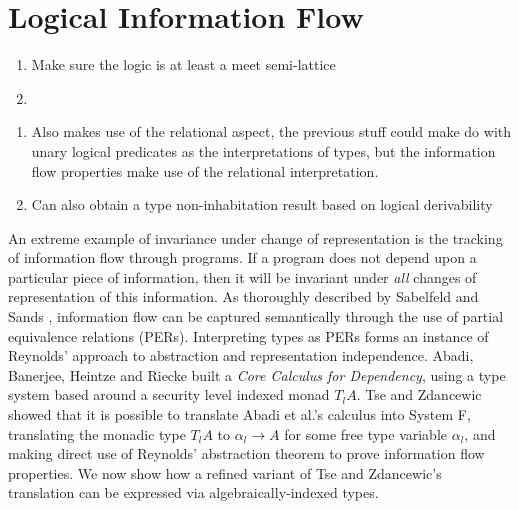 \section{Logical Information Flow}
\label{sec:information-flow}

\begin{enumerate}
\item Make sure the logic is at least a meet semi-lattice
\item 
\end{enumerate}

\begin{enumerate}
\item Also makes use of the relational aspect, the previous stuff
  could make do with unary logical predicates as the interpretations
  of types, but the information flow properties make use of the
  relational interpretation.
\item Can also obtain a type non-inhabitation result based on logical
  derivability
\end{enumerate}


An extreme example of invariance under change of representation is the
tracking of information flow through programs. If a program does not
depend upon a particular piece of information, then it will be
invariant under \emph{all} changes of representation of this
information. As thoroughly described by Sabelfeld and Sands
\cite{sabelfeld01per}, information flow can be captured semantically
through the use of partial equivalence relations (PERs). Interpreting
types as PERs forms an instance of Reynolds' approach to abstraction
and representation independence. Abadi, Banerjee, Heintze and Riecke
\cite{abadi99core} built a \emph{Core Calculus for Dependency}, using
a type system based around a security level indexed monad $T_lA$. Tse
and Zdancewic \cite{tse04translating} showed that it is possible to
translate Abadi et al.'s calculus into System F, translating the
monadic type $T_lA$ to $\alpha_l \to A$ for some free type variable
$\alpha_l$, and making direct use of Reynolds' abstraction theorem to
prove information flow properties. We now show how a refined variant
of Tse and Zdancewic's translation can be expressed via
algebraically-indexed types.

